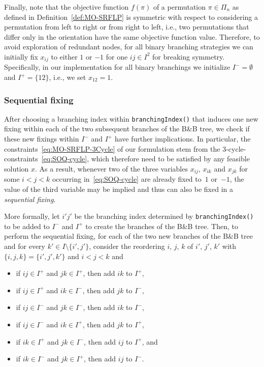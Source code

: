 \documentclass{article}
\newcommand{\BB}{B\&B\xspace}
\begin{document}
Finally, note that the objective function $f(\pi)$ of a permutation $\pi \in \Pi_n$ as defined in Definition~\ref{def:MO-SRFLP} is symmetric with respect to considering a permutation from left to right or from right to left, i.e., two permutations that differ only in the orientation have the same objective function value. Therefore, to avoid exploration of redundant nodes, for all binary branching strategies we can initially fix $x_{ij}$ to either $1$ or $-1$ for one $ij \in I^2$ for breaking symmetry. Specifically, in our implementation for all binary branchings we initialize $I^- = \emptyset$ and $I^+ = \{12\}$, i.e., we set $x_{12}=1$.

\subsubsection{Sequential fixing}\label{sec:sequential}
After choosing a branching index within \texttt{branchingIndex()} that induces one new fixing within each of the two subsequent branches of the \BB tree, we check if these new fixings within $I^-$ and $I^+$ have further implications. In particular, the constraints~\eqref{eq:MO-SRFLP-3Cycle} of our formulation stem from the 3-cycle-constraints~\eqref{eq:SOQ-cycle}, which therefore need to be satisfied by any feasible solution $x$. 
As a result, whenever two of the three variables $x_{ij}$, $x_{ik}$ and $x_{jk}$ for some $i<j<k$ occurring in~\eqref{eq:SOQ-cycle} are already fixed to~$1$ or~$-1$, the value of the third variable may be implied and thus can also be fixed in a \emph{sequential fixing}. 

More formally, let $i'j'$ be the branching index determined by \texttt{branchingIndex()} to be added to $I^-$ and $I^+$ to create the branches of the \BB tree. 
Then, to perform the sequential fixing, for each of the two new branches of the \BB tree and for every $k'\in I \setminus \{i',j'\}$, consider the reordering $i$, $j$, $k$ of $i'$, $j'$, $k'$ with $\{i,j,k\} = \{i',j',k'\}$ and $i<j<k$ and
\begin{itemize}[noitemsep]
\item if $ij \in I^+$ and $jk \in I^+$, then add $ik$ to $I^+$,
\item if $ij \in I^+$ and $ik \in I^-$, then add $jk$ to $I^-$,
\item if $ij \in I^-$ and $jk \in I^-$, then add $ik$ to $I^-$,
\item if $ij \in I^-$ and $ik \in I^+$, then add $jk$ to $I^+$,
\item if $ik \in I^+$ and $jk \in I^-$, then add $ij$ to $I^+$, and
\item if $ik \in I^-$ and $jk \in I^+$, then add $ij$ to $I^-$.
\end{itemize}
\end{document}
